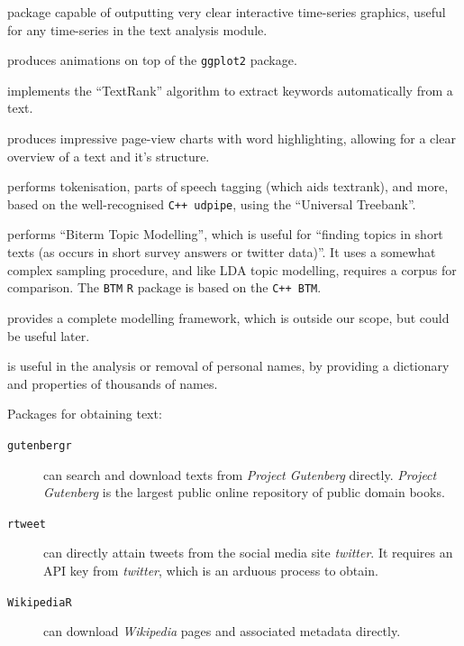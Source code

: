 \documentclass[11pt, a4paper, titlepage]{report}
\begin{document}
\begin{description}
  package capable of outputting very clear interactive time-series
  graphics, useful for any time-series in the text analysis module.
\item[\texttt{gganimate}\autocite{pedersen19}] produces animations on top of
  the \texttt{ggplot2} package.
\item[\texttt{textrank}\autocite{wijffels19}] implements the
  ``TextRank'' algorithm to extract keywords automatically from a
  text.
\item[\texttt{ggpage}\autocite{hvitfeldt19ggpage}] produces impressive
  page-view charts with word highlighting, allowing for a clear
  overview of a text and it's structure.
\item[\texttt{udpipe}\autocite{wijffels19:udpipe}] performs tokenisation, parts
  of speech tagging (which aids textrank), and more, based on the
  well-recognised \texttt{C++ udpipe}, using the ``Universal Treebank''.
\item[\texttt{BTM}\autocite{wijffels19:_btm}] performs ``Biterm Topic
  Modelling'', which is useful for ``finding topics in short texts (as
  occurs in short survey answers or twitter data)''. It uses a
  somewhat complex sampling procedure, and like LDA topic modelling,
  requires a corpus for comparison. The \texttt{BTM} \texttt{R}
  package is based on the \texttt{C++ BTM}.
\item[\texttt{crfsuite}\autocite{wijffels18crf}] provides a complete modelling
  framework, which is outside our scope, but could be useful later.
\item[\texttt{humaniformat}\autocite{keyes16}] is useful in the analysis or
  removal of personal names, by providing a dictionary and properties
  of thousands of names.
\item Packages for obtaining text:
  \begin{description}
  \item[\texttt{gutenbergr}\autocite{robinson19}] can search and
    download texts from \textit{Project Gutenberg} directly.
    \textit{Project Gutenberg} is the largest public online repository
    of public domain books.
  \item[\texttt{rtweet}\autocite{rtweet-package}] can directly attain tweets
    from the social media site \textit{twitter}. It requires an API key from
    \textit{twitter}, which is an arduous process to obtain.
  \item[\texttt{WikipediaR}\autocite{bar-hen16:_wikip}] can download \textit{Wikipedia}
    pages and associated metadata directly.
  \end{description}
\end{description}
\end{document}
